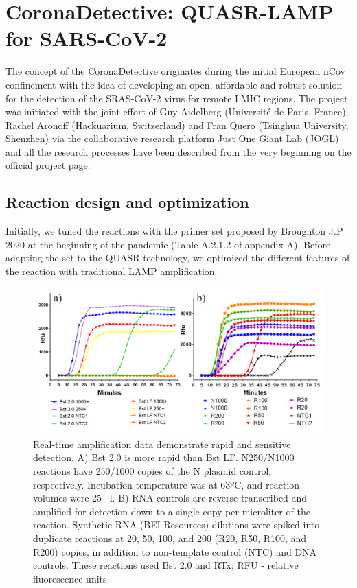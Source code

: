 
\chapter{CoronaDetective: QUASR-LAMP for SARS-CoV-2}

The concept of the CoronaDetective originates during the initial European nCov confinement with the idea of developing an open, affordable and robust solution for the detection of the SRAS-CoV-2 virus for remote LMIC regions. The project was initiated with the joint effort of Guy Aidelberg (Université de Paris, France), Rachel Aronoff (Hackuarium, Switzerland) and Fran Quero (Tsinghua University, Shenzhen) via the collaborative research platform Just One Giant Lab (JOGL) and all the research processes have been described from the very beginning on the official project page\cite{francisco_javier_quero_lombardero_-it-together_2019}.

\section{Reaction design and optimization}
Initially, we tuned the reactions with the primer set proposed by Broughton J.P 2020\cite{broughton_crisprcas12-based_2020} at the beginning of the pandemic (Table A.2.1.2 of appendix A). Before adapting the set to the QUASR technology, we optimized the different features of the reaction with traditional LAMP amplification.

\begin{figure}[b]
    \centering
    \includegraphics[width=1\textwidth]{figures/LAMP1.png}
    \caption{Real-time amplification data demonstrate rapid and sensitive detection. A) Bst 2.0 is more rapid than Bst LF. N250/N1000 reactions have 250/1000 copies of the N plasmid control, respectively. Incubation temperature was at 63ºC, and reaction volumes were 25 ~{\textmu}l. B) RNA controls are reverse transcribed and amplified for detection down to a single copy per microliter of the reaction. Synthetic RNA (BEI Resources) dilutions were spiked into duplicate reactions at 20, 50, 100, and 200 (R20, R50, R100, and R200) copies, in addition to non-template control (NTC) and DNA controls. These reactions used Bst 2.0 and RTx; RFU - relative fluorescence units.}
    \label{fig:LAMP1}
\end{figure}

